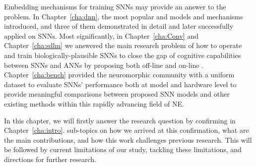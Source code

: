 Embedding \DIFdelbegin {}\DIFdelend \DIFaddbegin {}\DIFaddend mechanisms for training SNNs may provide an answer to the problem.
In Chapter~\ref{cha:dnn}, the most popular and \DIFdelbegin {}\DIFdelend \DIFaddbegin {}\DIFaddend models and mechanisms \DIFdelbegin {}\DIFdelend \DIFaddbegin {}\DIFaddend introduced, and three of them \DIFdelbegin {}\DIFdelend \DIFaddbegin {}\DIFaddend demonstrated in detail and later successfully applied on SNNs.
Most significantly, in Chapter~\ref{cha:Conv} and Chapter~\ref{cha:sdlm} we answered the main research problem of how to operate and train biologically-plausible SNNs to close the gap of cognitive capabilities between SNNs and ANNs by proposing \DIFdelbegin {}\DIFdelend both off-line and on-line \DIFaddbegin {}\DIFaddend .
Chapter~\ref{cha:bench} \DIFdelbegin {}\DIFdelend provided the neuromorphic community with a uniform dataset to evaluate SNNs' performance both at model and hardware level to provide meaningful comparisons between \DIFdelbegin {}\DIFdelend \DIFaddbegin {}\DIFaddend proposed SNN models and other existing methods within this rapidly advancing field of NE.%

In this chapter, we will firstly answer the research question by confirming \DIFdelbegin {}\DIFdelend \DIFaddbegin {}\DIFaddend in Chapter~\ref{cha:intro}.
\DIFdelbegin {}\DIFdelend \DIFaddbegin {}\DIFaddend sub-topics on how we arrived at this confirmation, what are the main contributions, and how this work challenges previous research.
This will be followed by \DIFdelbegin {}\DIFdelend \DIFaddbegin {}\DIFaddend current limitations of our study, \DIFdelbegin {}\DIFdelend \DIFaddbegin {}\DIFaddend tackling these limitations, and directions for further research.



